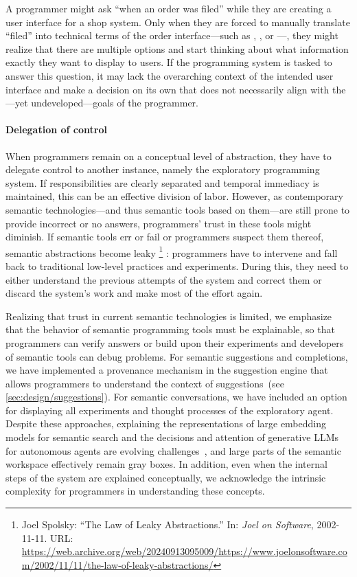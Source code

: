 \begin{example}
	A programmer might ask ``when an order was filed'' while they are creating a user interface for a shop system.
	Only when they are forced to manually translate ``filed'' into technical terms of the order interface---such as , , or ---, they might realize that there are multiple options and start thinking about what information exactly they want to display to users.
	If the programming system is tasked to answer this question, it may lack the overarching context of the intended user interface and make a decision on its own that does not necessarily align with the---yet undeveloped---goals of the programmer.
\end{example}

\paragraph{Delegation of control}
\label{par:discussion/experience/process/delegation}

When programmers remain on a conceptual level of abstraction, they have to delegate control to another instance, namely the exploratory programming system.
If responsibilities are clearly separated and temporal immediacy is maintained, this can be an effective division of labor.
However, as contemporary semantic technologies---and thus semantic tools based on them---are still prone to provide incorrect or no answers, programmers' trust in these tools might diminish.
If semantic tools err or fail or programmers suspect them thereof, semantic abstractions become leaky%
\footnote{\label{fn:joels_law}Joel Spolsky: ``The Law of Leaky Abstractions.'' In: \emph{Joel on Software}, 2002-11-11. URL: \url{https://web.archive.org/web/20240913095009/https://www.joelonsoftware.com/2002/11/11/the-law-of-leaky-abstractions/}}%
: programmers have to intervene and fall back to traditional low-level practices and experiments.
During this, they need to either understand the previous attempts of the system and correct them or discard the system's work and make most of the effort again.

Realizing that trust in current semantic technologies is limited, we emphasize that the behavior of semantic programming tools must be explainable, so that programmers can verify answers or build upon their experiments and developers of semantic tools can debug problems.
For semantic suggestions and completions, we have implemented a provenance mechanism in the suggestion engine that allows programmers to understand the context of suggestions~(see \cref{sec:design/suggestions}).
For semantic conversations, we have included an option for displaying all experiments and thought processes of the exploratory agent.
Despite these approaches, explaining the representations of large embedding models for semantic search and the decisions and attention of generative LLMs for autonomous agents are evolving challenges~\cites{chefer2021generic}[sec.~8.1.3]{zhao2023survey}, and large parts of the semantic workspace effectively remain gray boxes.
In addition, even when the internal steps of the system are explained conceptually, we acknowledge the intrinsic complexity for programmers in understanding these concepts.

